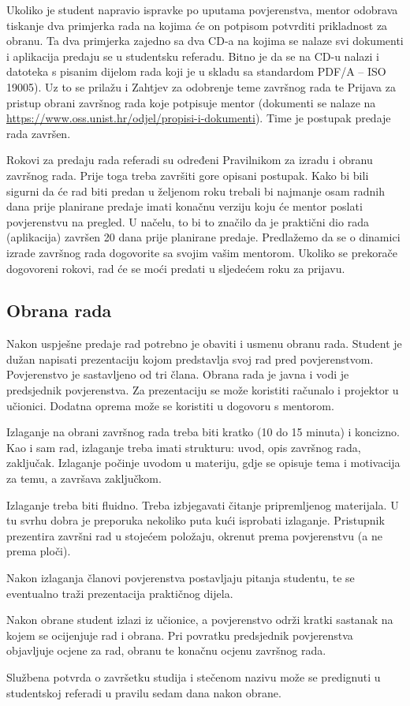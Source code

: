 Ukoliko je student napravio ispravke po uputama povjerenstva, mentor odobrava tiskanje dva primjerka rada na kojima će on potpisom potvrditi prikladnost za obranu. Ta dva primjerka zajedno sa dva CD-a na kojima se nalaze svi dokumenti i aplikacija predaju se u studentsku referadu. Bitno je da se na CD-u nalazi i datoteka s pisanim dijelom rada koji je u skladu sa standardom PDF/A – ISO 19005). Uz to se prilažu i Zahtjev za odobrenje teme završnog rada te Prijava za pristup obrani završnog rada koje potpisuje mentor (dokumenti se nalaze na \url{https://www.oss.unist.hr/odjel/propisi-i-dokumenti}). Time je postupak predaje rada završen.

Rokovi za predaju rada referadi su određeni Pravilnikom za izradu i obranu završnog rada. Prije toga treba završiti gore opisani postupak. Kako bi bili sigurni da će rad biti predan u željenom roku trebali bi najmanje osam radnih dana prije planirane predaje imati konačnu verziju koju će mentor poslati povjerenstvu na pregled. U načelu, to bi to značilo da je praktični dio rada (aplikacija) završen 20 dana prije planirane predaje. Predlažemo da se o dinamici izrade završnog rada dogovorite sa svojim vašim mentorom. Ukoliko se prekorače dogovoreni rokovi, rad će se moći predati u sljedećem roku za prijavu.

\subsection{Obrana rada}
Nakon uspješne predaje rad potrebno je obaviti i usmenu obranu rada. Student je dužan napisati prezentaciju kojom predstavlja svoj rad pred povjerenstvom. Povjerenstvo je sastavljeno od tri člana. Obrana rada je javna i vodi je predsjednik povjerenstva. Za prezentaciju se može koristiti računalo i projektor u učionici. Dodatna oprema može se koristiti u dogovoru s mentorom.

Izlaganje na obrani završnog rada treba biti kratko (10 do 15 minuta) i koncizno. Kao i sam rad, izlaganje treba imati strukturu: 
uvod, opis završnog rada, zaključak. Izlaganje počinje uvodom u materiju, gdje se opisuje tema i motivacija za temu, a završava zaključkom.

Izlaganje treba biti fluidno. Treba izbjegavati čitanje pripremljenog materijala. U tu svrhu dobra je preporuka nekoliko puta kući isprobati izlaganje. Pristupnik prezentira završni rad u stojećem položaju, okrenut prema povjerenstvu (a ne prema ploči).

Nakon izlaganja članovi povjerenstva postavljaju pitanja studentu, te se eventualno traži prezentacija praktičnog dijela. 

Nakon obrane student izlazi iz učionice, a povjerenstvo održi kratki sastanak na kojem se ocijenjuje rad i obrana. Pri povratku predsjednik povjerenstva objavljuje ocjene za rad, obranu te konačnu ocjenu završnog rada. 

Službena potvrda o završetku studija i stečenom nazivu može se predignuti u studentskoj referadi u pravilu sedam dana nakon obrane.